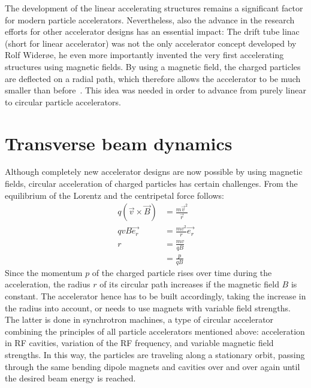 The development of the linear accelerating structures remains a significant factor for modern particle accelerators.
Nevertheless, also the advance in the research efforts for other accelerator designs has an essential impact:
The drift tube linac (short for linear accelerator) was not the only accelerator concept developed by Rolf Wider\o e, he even more importantly invented the very first accelerating structures using magnetic fields.
By using a magnetic field, the charged particles are deflected on a radial path, which therefore allows the accelerator to be much smaller than before~\cite[cf. p. 8]{Wilson}.
This idea was needed in order to advance from purely linear to circular particle accelerators.


\section{Transverse beam dynamics}
\label{AccPhysics:Magnets}

Although completely new accelerator designs are now possible by using magnetic fields, circular acceleration of charged particles has certain challenges.
From the equilibrium of the Lorentz and the centripetal force follows:
\begin{align}
q(\vec{v}\times \vec{B}) &= \frac{m\vec{v}^2}{\vec{r}}\\
qvB\vec{e_r} &= \frac{mv^2}{r}\vec{e_r} \nonumber \\
 r&=\frac{mv}{qB}\\
 &=\frac{p}{qB}\label{eq:MagField_Radius}
\end{align}
Since the momentum $p$ of the charged particle rises over time during the acceleration, the radius $r$ of its circular path increases if the magnetic field $B$ is constant.
The accelerator hence has to be built accordingly, taking the increase in the radius into account, or needs to use magnets with variable field strengths.
The latter is done in synchrotron machines, a type of circular accelerator combining the principles of all particle accelerators mentioned above: acceleration in RF cavities, variation of the RF frequency, and variable magnetic field strengths.
In this way, the particles are traveling along a stationary orbit, passing through the same bending dipole magnets and cavities over and over again until the desired beam energy is reached.

